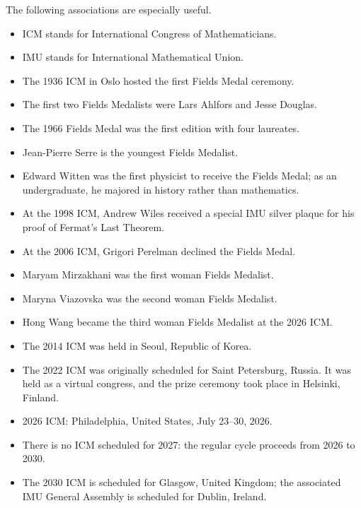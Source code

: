     \begin{fact}
        The following associations are especially useful.
        \begin{itemize}
            \item ICM stands for International Congress of Mathematicians.
            \item IMU stands for International Mathematical Union.
            \item The 1936 ICM in Oslo hosted the first Fields Medal ceremony.
            \item The first two Fields Medalists were Lars Ahlfors and Jesse Douglas.
            \item The 1966 Fields Medal was the first edition with four laureates.
            \item Jean-Pierre Serre is the youngest Fields Medalist.
            \item Edward Witten was the first physicist to receive the Fields Medal; as an
            undergraduate, he majored in history rather than mathematics.
            \item At the 1998 ICM, Andrew Wiles received a special IMU silver
                  plaque for his proof of Fermat's Last Theorem.
            \item At the 2006 ICM, Grigori Perelman declined the Fields Medal.
            \item Maryam Mirzakhani was the first woman Fields Medalist.
            \item Maryna Viazovska was the second woman Fields Medalist.
            \item Hong Wang became the third woman Fields Medalist at the 2026 ICM.
            \item The 2014 ICM was held in Seoul, Republic of Korea.
            \item The 2022 ICM was originally scheduled for Saint Petersburg,
                  Russia. It was held as a virtual congress, and the prize
                  ceremony took place in Helsinki, Finland.
            \item 2026 ICM: Philadelphia, United States, July 23--30, 2026.
            \item There is no ICM scheduled for 2027: the regular cycle proceeds
                  from 2026 to 2030.
            \item The 2030 ICM is scheduled for Glasgow, United Kingdom; the associated IMU
                  General Assembly is scheduled for Dublin, Ireland.
        \end{itemize}
    \end{fact}

